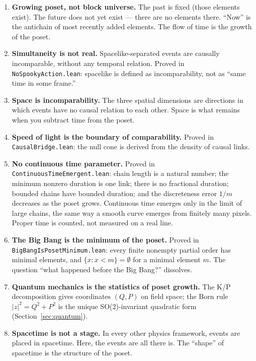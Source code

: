 \documentclass[11pt,letterpaper]{article}
\theoremstyle{remark}
\newcommand{\lean}[1]{\texttt{\small #1}}
\begin{document}
\begin{enumerate}[nosep]
  \item \textbf{Growing poset, not block universe.} The past is fixed
    (those elements exist). The future does not yet exist —
    there are no elements there. ``Now'' is the antichain of most
    recently added elements. The flow of time is the growth of the
    poset.
  \item \textbf{Simultaneity is not real.} Spacelike-separated events
    are causally incomparable, without any temporal relation. Proved
    in \lean{NoSpookyAction.lean}: spacelike is defined as
    incomparability, not as ``same time in some frame.''
  \item \textbf{Space is incomparability.} The three spatial
    dimensions are directions in which events have no causal relation
    to each other. Space is what remains when you subtract time from
    the poset.
  \item \textbf{Speed of light is the boundary of comparability.}
    Proved in \lean{CausalBridge.lean}: the null cone is derived from
    the density of causal links.
  \item \textbf{No continuous time parameter.} Proved in
    \lean{ContinuousTimeEmergent.lean}: chain length is a natural
    number; the minimum nonzero duration is one link; there is no
    fractional duration; bounded chains have bounded duration; and
    the discreteness error $1/m$ decreases as the poset grows.
    Continuous time emerges only in the limit of large chains, the
    same way a smooth curve emerges from finitely many pixels. Proper
    time is counted, not measured on a real line.
  \item \textbf{The Big Bang is the minimum of the poset.} Proved in
    \lean{BigBangIsPosetMinimum.lean}: every finite nonempty partial
    order has minimal elements, and $\{x : x < m\} = \emptyset$ for a
    minimal element $m$. The question ``what happened before the Big
    Bang?'' dissolves.
  \item \textbf{Quantum mechanics is the statistics of poset growth.}
    The K/P decomposition gives coordinates $(Q, P)$ on field space;
    the Born rule $|z|^2 = Q^2 + P^2$ is the unique SO(2)-invariant
    quadratic form (Section~\ref{sec:quantum}).
  \item \textbf{Spacetime is not a stage.} In every other physics
    framework, events are placed in spacetime. Here, the events are
    all there is. The ``shape'' of spacetime is the structure of the
    poset.
\end{enumerate}
\end{document}
